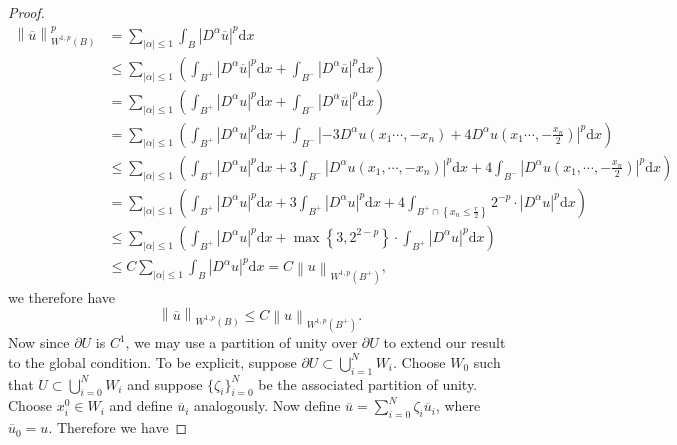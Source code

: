 \begin{proof}
$$
\begin{aligned}
\left\| \overline{u} \right\| _{W^{1,p}\left( B \right)}^{p}&=\sum_{\left| \alpha \right|\le 1}{\int_B{\left| D^{\alpha}\overline{u} \right|^p\mathrm{d}x}}
\\
&\le \sum_{\left| \alpha \right|\le 1}{\left( \int_{B^+}{\left| D^{\alpha}\overline{u} \right|^p\mathrm{d}x}+\int_{B^-}{\left| D^{\alpha}\overline{u} \right|^p\mathrm{d}x} \right)}
\\
&=\sum_{\left| \alpha \right|\le 1}{\left( \int_{B^+}{\left| D^{\alpha}u \right|^p\mathrm{d}x}+\int_{B^-}{\left| D^{\alpha}\overline{u} \right|^p\mathrm{d}x} \right)}
\\
&=\sum_{\left| \alpha \right|\le 1}{\left( \int_{B^+}{\left| D^{\alpha}u \right|^p\mathrm{d}x}+\int_{B^-}{\left| -3D^{\alpha}u\left( x_1\cdots ,-x_n \right) +4D^{\alpha}u\left( x_1\cdots ,-\frac{x_n}{2} \right) \right|^p\mathrm{d}x} \right)}
\\
&\le \sum_{\left| \alpha \right|\le 1}{\left( \int_{B^+}{\left| D^{\alpha}u \right|^p\mathrm{d}x}+3\int_{B^-}{\left| D^{\alpha}u\left( x_1, \cdots ,-x_n \right) \right|^p\mathrm{d}x}+4\int_{B^-}{\left| D^{\alpha}u\left( x_1, \cdots ,-\frac{x_n}{2} \right) \right|^p\mathrm{d}x} \right)}
\\
&=\sum_{\left| \alpha \right|\le 1}{\left( \int_{B^+}{\left| D^{\alpha}u \right|^p\mathrm{d}x}+3\int_{B^+}{\left| D^{\alpha}u \right|^p\mathrm{d}x}+4\int_{B^+\cap \left\{ x_n\le \frac{r}{2} \right\}}{2^{-p}\cdot \left| D^{\alpha}u \right|^p\mathrm{d}x} \right)}
\\
&\le \sum_{\left| \alpha \right|\le 1}{\left( \int_{B^+}{\left| D^{\alpha}u \right|^p\mathrm{d}x}+\max \left\{ 3,2^{2-p} \right\} \cdot \int_{B^+}{\left| D^{\alpha}u \right|^p\mathrm{d}x} \right)}
\\
&\le C\sum_{\left| \alpha \right|\le 1}{\int_B{\left| D^{\alpha}u \right|^p\mathrm{d}x}}=C\left\| u \right\| _{W^{1,p}\left( B^+ \right)},
\end{aligned}
$$
we therefore have 
$$
\left\| \overline{u} \right\| _{W^{1,p}\left( B \right)}\le C\left\| u \right\| _{W^{1,p}\left( B^+ \right)}.
$$
Now since $\partial U$ is $C^1$, we may use a partition of unity over $\partial U$ to extend our result to the global condition. To be explicit, suppose $\partial U\subset\bigcup_{i=1}^NW_i$. Choose $W_0$ such that $U\subset\bigcup_{i=0}^NW_i$ and suppose $\{\zeta_i\}_{i=0}^N$ be the associated partition of unity. Choose $x_i^0\in W_i$ and define $\overline{u}_i$ analogously. Now define $\overline{u}=\sum_{i=0}^N\zeta_i\overline{u}_i$, where $\overline{u}_0=u$. Therefore we have 

\end{proof}
